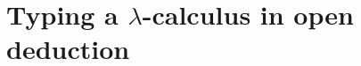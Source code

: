\documentclass[a4paper,UKenglish,cleveref, autoref]{lipics-v2019}
\begin{document}
%

\section{Typing a $\lambda$-calculus in open deduction}
\label{sec:typingacalculus}
\end{document}
